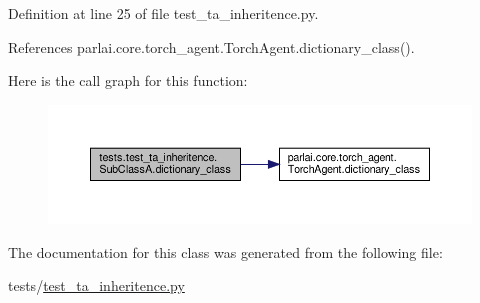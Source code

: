 Definition at line 25 of file test\+\_\+ta\+\_\+inheritence.\+py.



References parlai.\+core.\+torch\+\_\+agent.\+Torch\+Agent.\+dictionary\+\_\+class().

Here is the call graph for this function\+:
\nopagebreak
\begin{figure}[H]
\begin{center}
\leavevmode
\includegraphics[width=350pt]{classtests_1_1test__ta__inheritence_1_1SubClassA_aa01b5f43121b539c377b9b1d50f93d0c_cgraph}
\end{center}
\end{figure}


The documentation for this class was generated from the following file\+:\begin{DoxyCompactItemize}
\item 
tests/\hyperlink{test__ta__inheritence_8py}{test\+\_\+ta\+\_\+inheritence.\+py}\end{DoxyCompactItemize}
